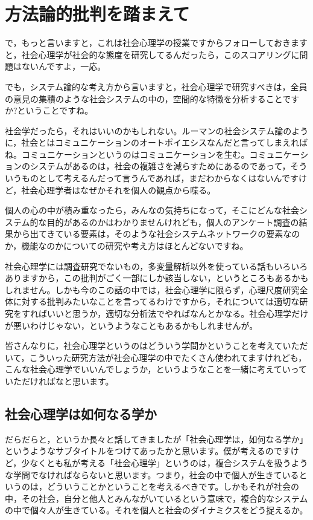 \documentclass{ltjsbook}
\begin{document}
\section{方法論的批判を踏まえて}

で，もっと言いますと，これは社会心理学の授業ですからフォローしておきますと，社会心理学が社会的な態度を研究してるんだったら，このスコアリングに問題はないんですよ，一応。

でも，システム論的な考え方から言いますと，社会心理学で研究すべきは，全員の意見の集積のような社会システムの中の，空間的な特徴を分析することですか?ということですね。

社会学だったら，それはいいのかもしれない。ルーマンの社会システム論のように，社会とはコミュニケーションのオートポイエシスなんだと言ってしまえればね。コミュニケーションというのはコミュニケーションを生む。コミュニケーションのシステムがあるのは，社会の複雑さを減らすためにあるのであって，そういうものとして考えるんだって言うんであれば，まだわからなくはないんですけど，社会心理学者はなぜかそれを個人の観点から喋る。

個人の心の中が積み重なったら，みんなの気持ちになって，そこにどんな社会システム的な目的があるのかはわかりませんけれども，個人のアンケート調査の結果から出てきている要素は，そのような社会システムネットワークの要素なのか，機能なのかについての研究や考え方はほとんどないですね。

社会心理学には調査研究でないもの，多変量解析以外を使っている話もいろいろありますから，この批判がごく一部にしか該当しない，というところもあるかもしれません。しかも今のこの話の中では，社会心理学に限らず，心理尺度研究全体に対する批判みたいなことを言ってるわけですから，それについては適切な研究をすればいいと思うか，適切な分析法でやればなんとかなる。社会心理学だけが悪いわけじゃない，というようなこともあるかもしれませんが。

皆さんなりに，社会心理学というのはどういう学問かということを考えていただいて，こういった研究方法が社会心理学の中でたくさん使われてますけれども，こんな社会心理学でいいんでしょうか，というようなことを一緒に考えていっていただければなと思います。

\subsection{社会心理学は如何なる学か}

だらだらと，というか長々と話してきましたが「社会心理学は，如何なる学か」というようなサブタイトルをつけてあったかと思います。僕が考えるのですけど，少なくとも私が考える「社会心理学」というのは，複合システムを扱うような学問でなければならないと思います。つまり，社会の中で個人が生きているというのは，どういうことかということを考えるべきです。しかもそれが社会の中，その社会，自分と他人とみんながいているという意味で，複合的なシステムの中で個々人が生きている。それを個人と社会のダイナミクスをどう捉えるか。
\end{document}
